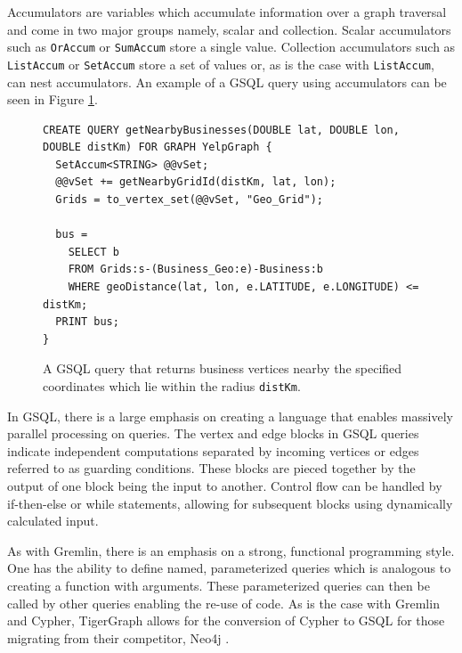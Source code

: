 Accumulators are variables which accumulate information over a graph traversal and come in two major groups namely, scalar and collection. Scalar accumulators such as \texttt{OrAccum} or \texttt{SumAccum} store a single value. Collection accumulators such as \texttt{ListAccum} or \texttt{SetAccum} store a set of values or, as is the case with \texttt{ListAccum}, can nest accumulators. An example of a GSQL query using accumulators can be seen in Figure \ref{lst:gsql-accum}.

\begin{figure}[h]
    \centering
    \begin{lstlisting}[language=gsql]
CREATE QUERY getNearbyBusinesses(DOUBLE lat, DOUBLE lon, DOUBLE distKm) FOR GRAPH YelpGraph {
  SetAccum<STRING> @@vSet;
  @@vSet += getNearbyGridId(distKm, lat, lon);
  Grids = to_vertex_set(@@vSet, "Geo_Grid");
	
  bus =
    SELECT b
    FROM Grids:s-(Business_Geo:e)-Business:b 
    WHERE geoDistance(lat, lon, e.LATITUDE, e.LONGITUDE) <= distKm;
  PRINT bus;
}
    \end{lstlisting}
    \caption{A GSQL query that returns business vertices nearby the specified coordinates which lie within the radius \texttt{distKm}.}
    \label{lst:gsql-accum}
\end{figure}


In GSQL, there is a large emphasis on creating a language that enables massively parallel processing on queries. The vertex and edge blocks in GSQL queries indicate independent computations separated by incoming vertices or edges referred to as guarding conditions. These blocks are pieced together by the output of one block being the input to another. Control flow can be handled by if-then-else or while statements, allowing for subsequent blocks using dynamically calculated input.

As with Gremlin, there is an emphasis on a strong, functional programming style. One has the ability to define named, parameterized queries which is analogous to creating a function with arguments. These parameterized queries can then be called by other queries enabling the re-use of code. As is the case with Gremlin and Cypher, TigerGraph allows for the conversion of Cypher to GSQL for those migrating from their competitor, Neo4j \cite{tigergraph-infoworld}.

